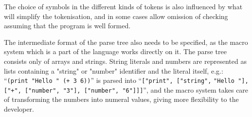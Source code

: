 The choice of symbols in the different kinds of tokens is also influenced by what will simplify the tokenisation, and in some cases allow omission of checking assuming that the program is well formed.

The intermediate format of the parse tree also needs to be specified, as the macro system which is a part of the language works directly on it. 
The parse tree consists only of arrays and strings. String literals and numbers are represented as lists containing a "string" or "number" identifier and the literal itself, e.g.: ``\verb|(print "Hello " (+ 3 6))|'' is parsed into ``\verb|["print", ["string",| \verb|"Hello "],| \verb|["+", ["number", "3"], ["number", "6"]]]|'', and the macro system takes care of transforming the numbers into numeral values, giving more flexibility to the developer.

